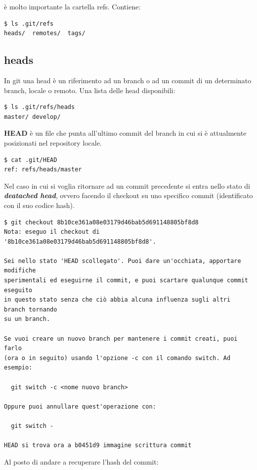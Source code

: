 \documentclass{article}
\begin{document}
è molto importante la cartella refs. Contiene:

\begin{verbatim}
$ ls .git/refs
heads/  remotes/  tags/
\end{verbatim}

\subsection{heads\label{heads}}
In git una head è un riferimento ad un branch o ad un commit di un determinato
branch, locale o remoto. Una lista delle head disponibili:

\begin{verbatim}
$ ls .git/refs/heads
master/ develop/
\end{verbatim}

\textbf{HEAD} è un file che punta all'ultimo commit del branch in cui si è
attualmente posizionati nel repository locale.

\begin{verbatim}
$ cat .git/HEAD
ref: refs/heads/master
\end{verbatim}

Nel caso in cui si voglia ritornare ad un commit precedente si entra nello stato
di \emph{\textbf{deatached head}}, ovvero facendo il checkout su uno specifico
commit (identificato con il suo codice hash).

\begin{verbatim}
$ git checkout 8b10ce361a08e03179d46bab5d691148805bf8d8
Nota: eseguo il checkout di '8b10ce361a08e03179d46bab5d691148805bf8d8'.

Sei nello stato 'HEAD scollegato'. Puoi dare un'occhiata, apportare modifiche
sperimentali ed eseguirne il commit, e puoi scartare qualunque commit eseguito
in questo stato senza che ciò abbia alcuna influenza sugli altri branch tornando
su un branch.

Se vuoi creare un nuovo branch per mantenere i commit creati, puoi farlo
(ora o in seguito) usando l'opzione -c con il comando switch. Ad esempio:

  git switch -c <nome nuovo branch>

Oppure puoi annullare quest'operazione con:

  git switch -

HEAD si trova ora a b0451d9 immagine scrittura commit
\end{verbatim}

Al posto di andare a recuperare l'hash del commit:
\end{document}
